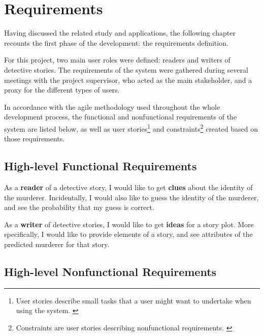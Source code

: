 \documentclass{mproj}
\begin{document}
\chapter{Requirements}

Having discussed the related study and applications, the following chapter recounts the first phase of the development: the requirements definition. \par

For this project, two main user roles were defined: readers and writers of detective stories. The requirements of the system were gathered during several meetings with the project supervisor, who acted as the main stakeholder, and a proxy for the different types of users. \par 

In accordance with the agile methodology used throughout the whole development process, the functional and nonfunctional requirements of the system are listed below, as well as user stories\footnote{User stories describe small tasks that a user might want to undertake when using the system. \cite[Chapter~1]{userstoriesbook}} and constraints\footnote{Constraints are user stories describing nonfunctional requirements. \cite{userstoriesbook}} created based on those requirements. 


\section{High-level Functional Requirements}
	
As a \textbf{reader} of a detective story, I would like to get \textbf{clues} about the identity of the murderer. Incidentally, I would also like to guess the identity of the murderer, and see the probability that my guess is correct. \par

As a \textbf{writer} of detective stories, I would like to get \textbf{ideas} for a story plot. More specifically, I would like to provide elements of a story, and see attributes of the predicted murderer for that story.\par

\section{High-level Nonfunctional Requirements}
	
\end{document}
